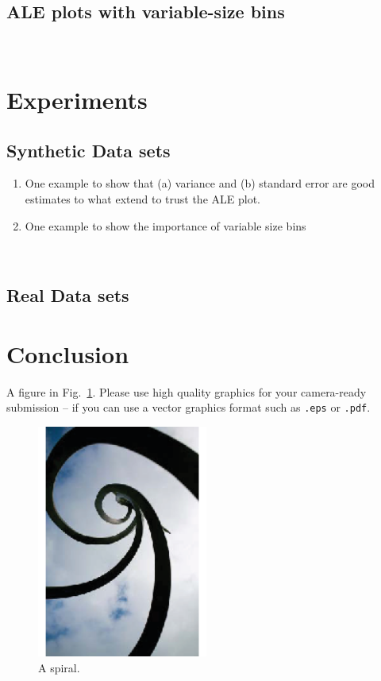 \documentclass[wcp]{jmlr}
\newcommand{\1}{\mathbbm{1}}
\begin{document}
\subsection{ALE plots with variable-size bins}

\newpage
~\newpage

\section{Experiments}

\subsection{Synthetic Data sets}

\begin{enumerate}
\item One example to show that (a) variance and (b) standard error are
  good estimates to what extend to trust the ALE plot.
\item One example to show the importance of variable size bins
\end{enumerate}

\newpage
~\newpage

\subsection{Real Data sets}

\newpage

\section{Conclusion}


A figure in Fig.~\ref{fig:spiral}. Please use high quality graphics
for your camera-ready submission -- if you can use a vector graphics
format such as \texttt{.eps} or \texttt{.pdf}.
\begin{figure}[htp]
\begin{center}
\includegraphics[width=0.5\textwidth]{spiral.eps}
\caption{A spiral.}\label{fig:spiral}
\end{center}
\end{figure}
\end{document}

